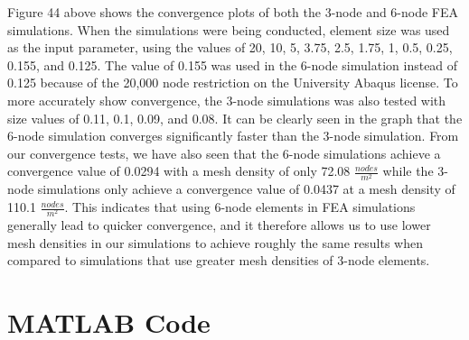 \documentclass[a4paper]{article}
\begin{document}
Figure 44 above shows the convergence plots of both the 3-node and 6-node FEA simulations. When the simulations were being conducted, element size was used as the input parameter, using the values of 20, 10, 5, 3.75, 2.5, 1.75, 1, 0.5, 0.25, 0.155, and 0.125. The value of 0.155 was used in the 6-node simulation instead of 0.125 because of the 20,000 node restriction on the University Abaqus license. To more accurately show convergence, the 3-node simulations was also tested with size values of 0.11, 0.1, 0.09, and 0.08.  It can be clearly seen in the graph that the 6-node simulation converges significantly faster than the 3-node simulation.  From our convergence tests, we have also seen that the 6-node simulations achieve a convergence value of 0.0294 with a mesh density of only 72.08 $\frac{nodes}{m^{2}}$ while the 3-node simulations only achieve a convergence value of 0.0437 at a mesh density of 110.1 $\frac{nodes}{m^{2}}$. This indicates that using 6-node elements in FEA simulations generally lead to quicker convergence, and it therefore allows us to use lower mesh densities in our simulations to achieve roughly the same results when compared to simulations that use greater mesh densities of 3-node elements.

\clearpage

\section*{MATLAB Code}


\end{document}
